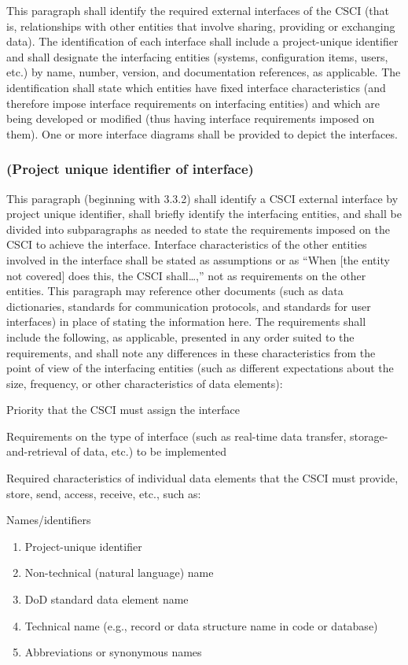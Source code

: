 \documentclass{fidata-report-template}
\begin{document}
This paragraph shall identify the required external interfaces of the
CSCI (that is, relationships with other entities that involve sharing,
providing or exchanging data). The identification of each interface
shall include a project-unique identifier and shall designate the
interfacing entities (systems, configuration items, users, etc.) by
name, number, version, and documentation references, as applicable. The
identification shall state which entities have fixed interface
characteristics (and therefore impose interface requirements on
interfacing entities) and which are being developed or modified (thus
having interface requirements imposed on them). One or more interface
diagrams shall be provided to depict the interfaces.

\subsubsection{(Project unique identifier of interface)}

This paragraph (beginning with 3.3.2) shall identify a CSCI external
interface by project unique identifier, shall briefly identify the
interfacing entities, and shall be divided into subparagraphs as needed
to state the requirements imposed on the CSCI to achieve the interface.
Interface characteristics of the other entities involved in the
interface shall be stated as assumptions or as ``When {[}the entity not
covered{]} does this, the CSCI shall\ldots{},'' not as requirements on
the other entities. This paragraph may reference other documents (such
as data dictionaries, standards for communication protocols, and
standards for user interfaces) in place of stating the information here.
The requirements shall include the following, as applicable, presented
in any order suited to the requirements, and shall note any differences
in these characteristics from the point of view of the interfacing
entities (such as different expectations about the size, frequency, or
other characteristics of data elements):

Priority that the CSCI must assign the interface

Requirements on the type of interface (such as real-time data transfer,
storage-and-retrieval of data, etc.) to be implemented

Required characteristics of individual data elements that the CSCI must
provide, store, send, access, receive, etc., such as:

Names/identifiers

\begin{enumerate}
\itemsep1pt\parskip0pt
\item
  Project-unique identifier
\item
  Non-technical (natural language) name
\item
  DoD standard data element name
\item
  Technical name (e.g., record or data structure name in code or
  database)
\item
  Abbreviations or synonymous names
\end{enumerate}
\end{document}
